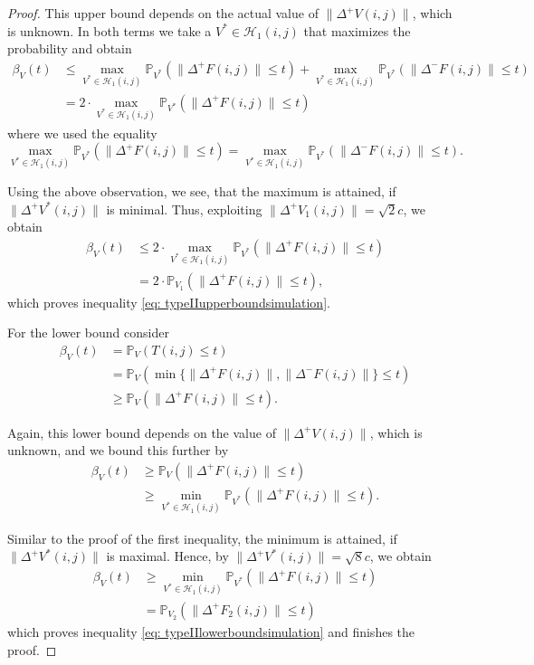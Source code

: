 \documentclass[a4paper,12pt]{article}
\newcommand{\norm}[1]{\lVert#1\rVert}
\theoremstyle{plain}
\theoremstyle{definition}
\numberwithin{equation}{section}
\begin{document}
\begin{proof}
	This upper bound depends on the actual value of $\norm{\Delta^+ V(i, j)}$, which is unknown. In both terms we take a $V^* \in \mathcal{H}_1(i, j)$ that maximizes the probability and obtain
	\begin{align*}
		\beta_V(t) &\leq \max_{V^* \in \mathcal{H}_1(i, j)} \mathbb{P}_{V^*}\left( \norm{\Delta^+ F(i, j)} \leq t \right) + \max_{V^* \in \mathcal{H}_1(i, j)} \mathbb{P}_{V^*}\left( \norm{\Delta^- F(i, j)} \leq t \right) \\
		&= 2 \cdot \max_{V^* \in \mathcal{H}_1(i, j)} \mathbb{P}_{V^*}\left( \norm{\Delta^+ F(i, j)} \leq t \right)
	\end{align*}
	where we used the equality
	\begin{equation*}
		\max_{V^* \in \mathcal{H}_1(i, j)} \mathbb{P}_{V^*}\left( \norm{\Delta^+ F(i, j)} \leq t \right) = \max_{V^* \in \mathcal{H}_1(i, j)} \mathbb{P}_{V^*}\left( \norm{\Delta^- F(i, j)} \leq t \right).
	\end{equation*}
	
	Using the above observation, we see, that the maximum is attained, if $\norm{\Delta^+ V^*(i, j)}$ is minimal. Thus, exploiting $\norm{\Delta^+ V_1(i, j)} = \sqrt{2} c$, we obtain
	\begin{align*}
		\beta_V(t) &\leq 2 \cdot \max_{V^* \in \mathcal{H}_1(i, j)} \mathbb{P}_{V^*}\left( \norm{\Delta^+ F(i, j)} \leq t \right) \\
		&= 2 \cdot \mathbb{P}_{V_1}\left( \norm{\Delta^+ F(i, j)} \leq t \right),
	\end{align*}
	which proves inequality \eqref{eq: typeIIupperboundsimulation}.
	
	For the lower bound consider
	\begin{align*}
		\beta_V(t) &= \mathbb{P}_V\left( T(i, j) \leq t \right) \\
		&= \mathbb{P}_V\left( \min \{ \norm{\Delta^+ F(i, j)}, \norm{\Delta^- F(i, j)} \} \leq t \right) \\
		&\geq \mathbb{P}_V\left( \norm{\Delta^+ F(i, j)} \leq t \right).
	\end{align*}
	
	Again, this lower bound depends on the value of $\norm{\Delta^+ V(i, j)}$, which is unknown, and we bound this further by
	\begin{align*}
		\beta_V(t) &\geq \mathbb{P}_V\left( \norm{\Delta^+ F(i, j)} \leq t \right) \\
		&\geq \min_{V^* \in \mathcal{H}_1(i, j)} \mathbb{P}_{V^*}\left( \norm{\Delta^+ F(i, j)} \leq t \right).
	\end{align*}
	
	Similar to the proof of the first inequality, the minimum is attained, if $\norm{\Delta^+ V^*(i, j)}$ is maximal. Hence, by $\norm{\Delta^+ V^*(i, j)} = \sqrt{8} c$, we obtain
	\begin{align*}
		\beta_V(t) &\geq \min_{V^* \in \mathcal{H}_1(i, j)} \mathbb{P}_{V^*}\left( \norm{\Delta^+ F(i, j)} \leq t \right) \\
		&= \mathbb{P}_{V_2}\left( \norm{\Delta^+ F_2(i, j)} \leq t \right)
	\end{align*}
	which proves inequality \eqref{eq: typeIIlowerboundsimulation} and finishes the proof.
\end{proof}
\end{document}
